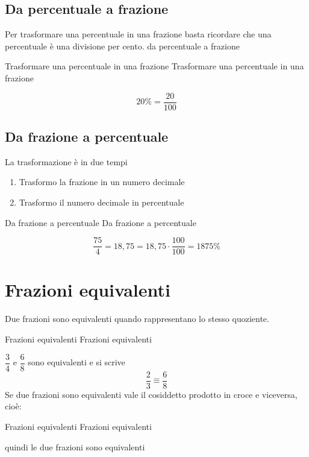 \subsection{Da percentuale a frazione}
Per trasformare una percentuale in una frazione basta ricordare che una percentuale è una divisione per cento.
da percentuale a frazione
\begin{esempiot}{Trasformare una percentuale in una frazione}{}
Trasformare una percentuale in una frazione
\end{esempiot}
\[20\%=\dfrac{20}{100} \]
\subsection{Da frazione a percentuale}
La trasformazione è in due tempi 
\begin{enumerate}
	\item Trasformo la frazione in un numero decimale
	\item Trasformo il numero decimale in percentuale
\end{enumerate}
\begin{esempiot}{Da frazione a percentuale}{}
Da frazione a percentuale
\end{esempiot}
\[\dfrac{75}{4}=18,75=18,75\cdot\dfrac{100}{100}=1875\% \]
\section{Frazioni equivalenti}
\label{sec:FrazioniEquivalentiNumRazzASS}
Due frazioni sono equivalenti quando rappresentano lo stesso quoziente.
\begin{esempiot}{Frazioni  equivalenti}{}
Frazioni  equivalenti
\end{esempiot}
$\dfrac{3}{4}$ e $\dfrac{6}{8}$ sono equivalenti e  si scrive \[\dfrac{2}{3} \equiv\dfrac{6}{8}\]
Se due frazioni sono equivalenti vale il cosiddetto prodotto in croce e viceversa, cioè:
\begin{center}
\end{center}
\begin{esempiot}{Frazioni  equivalenti}{}
Frazioni  equivalenti
\end{esempiot}
\begin{center}
\end{center}
quindi le due frazioni sono equivalenti

